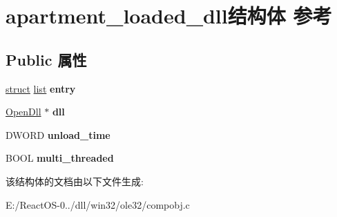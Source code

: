 \hypertarget{structapartment__loaded__dll}{}\section{apartment\+\_\+loaded\+\_\+dll结构体 参考}
\label{structapartment__loaded__dll}
\subsection*{Public 属性}
\begin{DoxyCompactItemize}
\item 
\mbox{\label{structapartment__loaded__dll_ac8c856b752a0f33f8b1b2ac57747f41d}} 
\hyperlink{interfacestruct}{struct} \hyperlink{classlist}{list} {\bfseries entry}
\item 
\mbox{\label{structapartment__loaded__dll_a56d614dd3eb30c54638dc1d19cea17f9}} 
\hyperlink{structtag_open_dll}{Open\+Dll} $\ast$ {\bfseries dll}
\item 
\mbox{\label{structapartment__loaded__dll_aa114547633e97d609bf086f182df922c}} 
D\+W\+O\+RD {\bfseries unload\+\_\+time}
\item 
\mbox{\label{structapartment__loaded__dll_ae8c7a0e9f1398b61825affa25361b58a}} 
B\+O\+OL {\bfseries multi\+\_\+threaded}
\end{DoxyCompactItemize}


该结构体的文档由以下文件生成\+:\begin{DoxyCompactItemize}
\item 
E\+:/\+React\+O\+S-\/0../dll/win32/ole32/compobj.\+c\end{DoxyCompactItemize}
